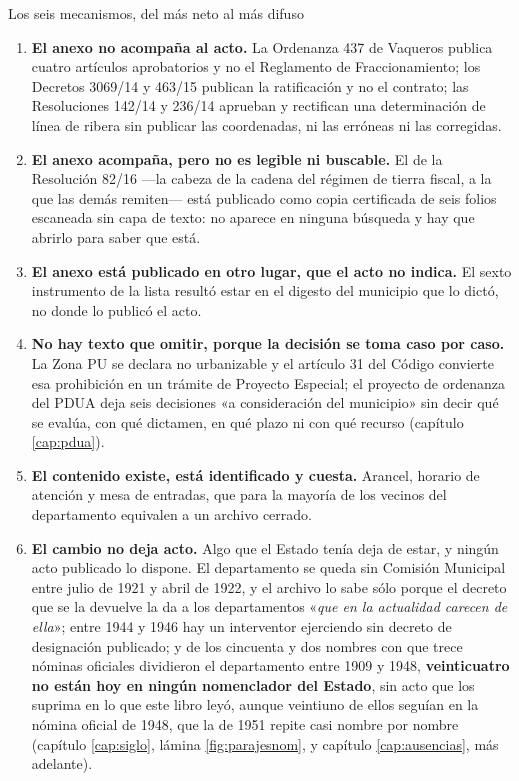 \begin{ficha}{Los seis mecanismos, del más neto al más difuso}
\begin{enumerate}[leftmargin=*,nosep]
\item \textbf{El anexo no acompaña al acto.} La Ordenanza 437 de Vaqueros publica cuatro
artículos aprobatorios y no el Reglamento de Fraccionamiento; los Decretos 3069/14 y 463/15
publican la ratificación y no el contrato; las Resoluciones 142/14 y 236/14 aprueban y
rectifican una determinación de línea de ribera sin publicar las coordenadas, ni las erróneas
ni las corregidas.
\item \textbf{El anexo acompaña, pero no es legible ni buscable.} El de la Resolución 82/16
---la cabeza de la cadena del régimen de tierra fiscal, a la que las demás remiten--- está
publicado como copia certificada de seis folios escaneada sin capa de texto: no aparece en
ninguna búsqueda y hay que abrirlo para saber que está.
\item \textbf{El anexo está publicado en otro lugar, que el acto no indica.} El sexto
instrumento de la lista resultó estar en el digesto del municipio que lo dictó, no donde lo
publicó el acto.
\item \textbf{No hay texto que omitir, porque la decisión se toma caso por caso.} La Zona PU se
declara no urbanizable y el artículo 31 del Código convierte esa prohibición en un trámite de
Proyecto Especial; el proyecto de ordenanza del PDUA deja seis decisiones «a consideración del
municipio» sin decir qué se evalúa, con qué dictamen, en qué plazo ni con qué recurso (capítulo
\ref{cap:pdua}).
\item \textbf{El contenido existe, está identificado y cuesta.} Arancel, horario de atención y
mesa de entradas, que para la mayoría de los vecinos del departamento equivalen a un archivo
cerrado.
\item \textbf{El cambio no deja acto.} Algo que el Estado tenía deja de estar, y ningún acto
publicado lo dispone. El departamento se queda sin Comisión Municipal entre julio de 1921 y abril
de 1922, y el archivo lo sabe sólo porque el decreto que se la devuelve la da a los
departamentos «\textit{que en la actualidad carecen de ella}»; entre 1944 y 1946 hay un
interventor ejerciendo sin decreto de designación publicado; y de los cincuenta y dos nombres con
que trece nóminas oficiales dividieron el departamento entre 1909 y 1948, \textbf{veinticuatro no
están hoy en ningún nomenclador del Estado}, sin acto que los suprima en lo que este libro leyó, aunque veintiuno de ellos
seguían en la nómina oficial de 1948, que la de 1951 repite casi nombre por nombre (capítulo
\ref{cap:siglo}, lámina \ref{fig:parajesnom}, y capítulo \ref{cap:ausencias}, más adelante).
\end{enumerate}
\end{ficha}

